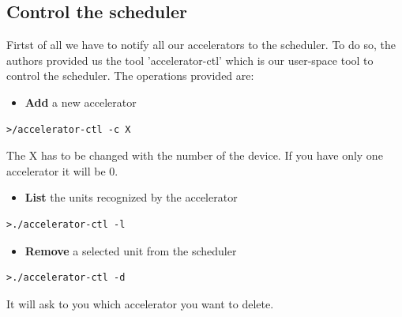 \documentclass[a4paper,13pt]{article}
\begin{document}
\begin{multicols}{2}
    \subsection{Control the scheduler}
        Firtst of all we have to notify all our accelerators to the scheduler. To do so, the authors provided 
        us the tool 'accelerator-ctl' which is our user-space tool
        to control the scheduler. The operations provided are:
        \begin{itemize}
            \item{{\bf Add} a new accelerator}\\
        \end{itemize}
        \vspace{-2ex}
\begin{lstlisting}
>/accelerator-ctl -c X
\end{lstlisting}
        The X has to be changed with  the number of the device. If you have only one accelerator it will be 0.\\
        \begin{itemize}
            \item{{\bf List} the units recognized by the accelerator}\\
        \end{itemize}
        \vspace{-2ex}
\begin{lstlisting}
>./accelerator-ctl -l
\end{lstlisting}
        \begin{itemize}
            \item{{\bf Remove} a selected unit from the scheduler}\\
        \end{itemize}
        \vspace{-2ex}
\begin{lstlisting}
>./accelerator-ctl -d
\end{lstlisting}
        It will ask to you which accelerator you want to delete.\\
    \subsection{}




\end{multicols}
\end{document}
